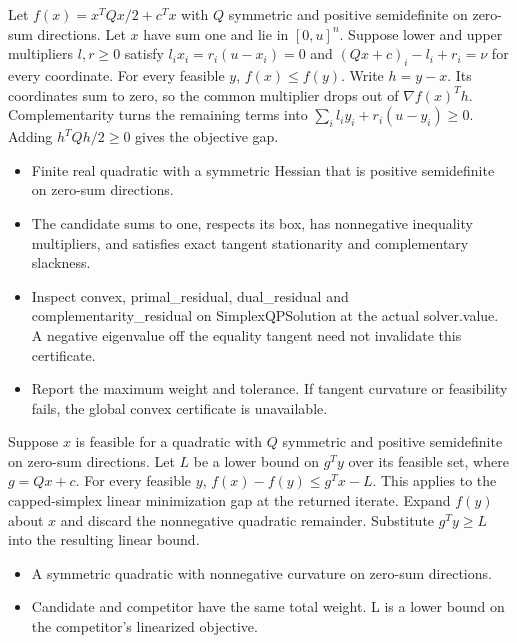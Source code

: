 \expandafter\def\csname statadic@statement@STATADIC-SIMPLEX-001\endcsname{Let $f(x)=x^TQx/2+c^Tx$ with $Q$ symmetric and positive semidefinite on zero-sum directions.
  Let $x$ have sum one and lie in $[0,u]^n$. Suppose lower and upper multipliers
  $l,r\ge0$ satisfy $l_ix_i=r_i(u-x_i)=0$ and
  $(Qx+c)_i-l_i+r_i=\nu$ for every coordinate. For every feasible $y$,
  $f(x)\le f(y)$.}
\expandafter\def\csname statadic@proof@STATADIC-SIMPLEX-001\endcsname{Write $h=y-x$. Its coordinates sum to zero, so the common multiplier
  drops out of $\nabla f(x)^Th$. Complementarity turns the remaining terms into
  $\sum_i l_iy_i+r_i(u-y_i)\ge0$. Adding $h^TQh/2\ge0$ gives the objective gap.}
\expandafter\def\csname statadic@assumptions@STATADIC-SIMPLEX-001\endcsname{\begin{itemize}
\item Finite real quadratic with a symmetric Hessian that is positive semidefinite on zero-sum directions.
\item The candidate sums to one, respects its box, has nonnegative inequality multipliers, and satisfies exact tangent stationarity and complementary slackness.
\end{itemize}}
\expandafter\def\csname statadic@diagnostics@STATADIC-SIMPLEX-001\endcsname{\begin{itemize}
\item Inspect convex, primal\_residual, dual\_residual and complementarity\_residual on SimplexQPSolution at the actual solver.value. A negative eigenvalue off the equality tangent need not invalidate this certificate.
\item Report the maximum weight and tolerance. If tangent curvature or feasibility fails, the global convex certificate is unavailable.
\end{itemize}}
\expandafter\def\csname statadic@statement@STATADIC-SIMPLEX-002\endcsname{Suppose $x$ is feasible for a quadratic with $Q$ symmetric and positive
  semidefinite on zero-sum directions. Let $L$ be a lower bound on $g^Ty$ over its feasible
  set, where $g=Qx+c$. For every feasible $y$, $f(x)-f(y)\le g^Tx-L$.
  This applies to the capped-simplex linear minimization gap at the returned iterate.}
\expandafter\def\csname statadic@proof@STATADIC-SIMPLEX-002\endcsname{Expand $f(y)$ about $x$ and discard the nonnegative quadratic
  remainder. Substitute $g^Ty\ge L$ into the resulting linear bound.}
\expandafter\def\csname statadic@assumptions@STATADIC-SIMPLEX-002\endcsname{\begin{itemize}
\item A symmetric quadratic with nonnegative curvature on zero-sum directions.
\item Candidate and competitor have the same total weight. L is a lower bound on the competitor’s linearized objective.
\end{itemize}}
